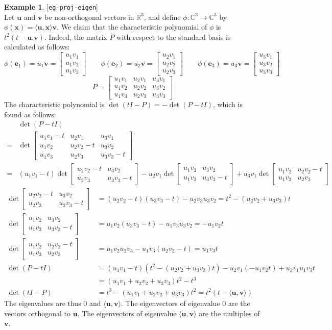 \documentclass{amsart}
\newcommand{\lbl}[1]{\label{#1}\textup{[\texttt{#1}]}\ \\}
\newcommand{\lbl}{\label}
\newcommand{\R}         {{\mathbb{R}}}
\newcommand{\C}         {{\mathbb{C}}}
\newcommand{\bsm}       {\left[\begin{smallmatrix}}
\newcommand{\esm}       {\end{smallmatrix}\right]}
\newcommand{\xra}       {\xrightarrow}
\newcommand{\ip}[1]     {\langle #1\rangle}
\newcommand{\ve}        {\mathbf{e}}
\newcommand{\vu}        {\mathbf{u}}
\newcommand{\vv}        {\mathbf{v}}
\newcommand{\vx}        {\mathbf{x}}
\renewcommand{\:}       {\colon}
\theoremstyle{definition}
\newtheorem{example}[theorem]{Example}
\begin{document}
\begin{example}\lbl{eg-proj-eigen}
 Let $\vu$ and $\vv$ be non-orthogonal vectors in $\R^3$, and define
 $\phi\:\C^3\xra{}\C^3$ by $\phi(\vx)=\ip{\vu,\vx}\vv$.  We
 claim that the characteristic polynomial of $\phi$ is
 $t^2(t-\vu.\vv)$.  Indeed, the matrix $P$ with respect to the
 standard basis is calculated as follows:
 {\tiny \[
  \phi(\ve_1)=u_1\vv=\bsm u_1v_1\\ u_1v_2\\ u_1v_3\esm \hspace{2em}
  \phi(\ve_2)=u_2\vv=\bsm u_2v_1\\ u_2v_2\\ u_2v_3\esm \hspace{2em}
  \phi(\ve_3)=u_3\vv=\bsm u_3v_1\\ u_3v_2\\ u_3v_3\esm \]
 \[
  P = \bsm u_1v_1 & u_2v_1 & u_3v_1 \\
           u_1v_2 & u_2v_2 & u_3v_2 \\
           u_1v_3 & u_2v_3 & u_3v_3 \esm
 \]} 
 The characteristic polynomial is $\det(tI-P)=-\det(P-tI)$, which is
 found as follows:
 {\tiny \begin{align*}
   & \det(P-tI) \\ =&
   \det\bsm u_1v_1-t & u_2v_1   & u_3v_1 \\
            u_1v_2   & u_2v_2-t & u_3v_2 \\
            u_1v_3   & u_2v_3   & u_3v_3-t \esm \\
   =& (u_1v_1-t)\det\bsm u_2v_2-t & u_3v_2 \\ u_2v_3   & u_3v_3-t \esm 
      - u_2v_1\det\bsm u_1v_2 & u_3v_2 \\ u_1v_3 & u_3v_3-t\esm
      + u_3v_1\det\bsm u_1v_2 & u_2v_2-t\\ u_1v_3 & u_2v_3\esm
  \end{align*}}
 {\tiny
  \begin{align*}
   \det\bsm u_2v_2-t & u_3v_2 \\ u_2v_3   & u_3v_3-t \esm &=
    (u_2v_2-t)(u_3v_3-t)-u_2v_3u_3v_2 = 
     t^2-(u_2v_2+u_3v_3)t \\
   \det\bsm u_1v_2 & u_3v_2 \\ u_1v_3 & u_3v_3-t\esm &=
    u_1v_2(u_3v_3-t)-u_1v_3u_3v_2 =
    -u_1v_2t \\
   \det\bsm u_1v_2 & u_2v_2-t\\ u_1v_3 & u_2v_3\esm &=
    u_1v_2u_2v_3 -u_1v_3(u_2v_2-t) = u_1v_3t \\
   \det(P-tI) &= (u_1v_1-t)(t^2-(u_2v_2+u_3v_3)t) -u_2v_1(-u_1v_2t)+u_3v_1u_1v_3t\\
      &= (u_1v_1+u_2v_2+u_3v_3)t^2-t^3 \\
   \det(tI-P) &= t^3-(u_1v_1+u_2v_2+u_3v_3)t^2=t^2(t-\ip{\vu,\vv})
 \end{align*}}
 The eigenvalues are thus $0$ and $\ip{\vu,\vv}$.  The eigenvectors
 of eigenvalue $0$ are the vectors orthogonal to $\vu$.  The
 eigenvectors of eigenvalue $\ip{\vu,\vv}$ are the multiples of $\vv$.


\end{example}
\end{document}
